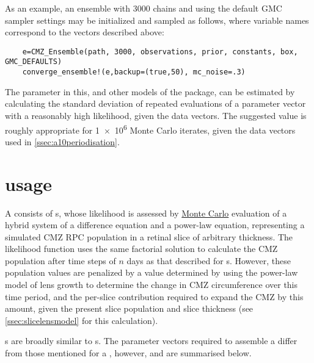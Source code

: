 As an example, an ensemble with 3000 chains and using the default GMC sampler settings may be initialized and sampled as follows, where variable names correspond to the vectors described above:

\begin{verbatim}
    e=CMZ_Ensemble(path, 3000, observations, prior, constants, box, GMC_DEFAULTS)
    converge_ensemble!(e,backup=(true,50), mc_noise=.3)
\end{verbatim}

The  parameter in this, and other models of the package, can be estimated by calculating the standard deviation of repeated evaluations of a parameter vector with a reasonably high likelihood, given the data vectors. The suggested value is roughly appropriate for \num{1e6} Monte Carlo iterates, given the data vectors used in \autoref{ssec:a10periodisation}.

\section{\protect{} usage}
A  consists of s, whose likelihood is assessed by \hyperref[MonteCarlo]{Monte Carlo} evaluation of a hybrid system of a difference equation and a power-law equation, representing a simulated CMZ RPC population in a retinal slice of arbitrary thickness. The  likelihood function uses the same factorial solution to calculate the CMZ population after time steps of $n$ days as that described for s. However, these population values are penalized by a value determined by using the power-law model of lens growth to determine the change in CMZ circumference over this time period, and the per-slice contribution required to expand the CMZ by this amount, given the present slice population and slice thickness (see \autoref{ssec:slicelensmodel} for this calculation).

s are broadly similar to s. The parameter vectors required to assemble a  differ from those mentioned for a , however, and are summarised below. 

